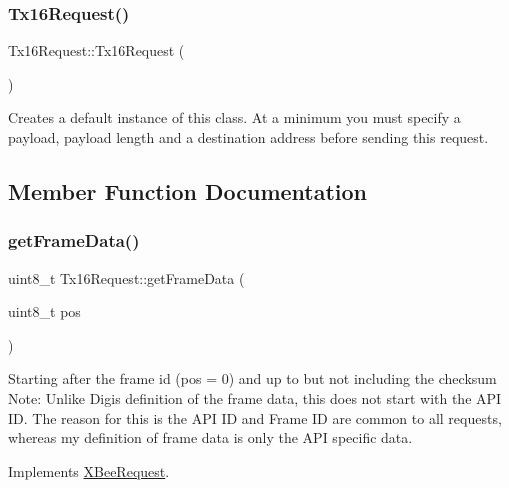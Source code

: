 \subsubsection{\texorpdfstring{Tx16\+Request()}{Tx16Request()}\hspace{0.1cm}{\footnotesize\ttfamily [2/2]}}
{\footnotesize\ttfamily Tx16\+Request\+::\+Tx16\+Request (\begin{DoxyParamCaption}{ }\end{DoxyParamCaption})}

Creates a default instance of this class. At a minimum you must specify a payload, payload length and a destination address before sending this request. 

\subsection{Member Function Documentation}
\hypertarget{class_tx16_request_af5ffbc2164e766d96f54c723996fd389}{}\label{class_tx16_request_af5ffbc2164e766d96f54c723996fd389} 
\subsubsection{\texorpdfstring{get\+Frame\+Data()}{getFrameData()}}
{\footnotesize\ttfamily uint8\+\_\+t Tx16\+Request\+::get\+Frame\+Data (\begin{DoxyParamCaption}\item[{uint8\+\_\+t}]{pos }\end{DoxyParamCaption})\hspace{0.3cm}{\ttfamily [virtual]}}

Starting after the frame id (pos = 0) and up to but not including the checksum Note\+: Unlike Digi\textquotesingle{}s definition of the frame data, this does not start with the A\+PI ID. The reason for this is the A\+PI ID and Frame ID are common to all requests, whereas my definition of frame data is only the A\+PI specific data. 

Implements \hyperlink{class_x_bee_request_ad5b998cd95a570bdaa4d74c6c8790d94}{X\+Bee\+Request}.

\hypertarget{class_tx16_request_a9a1ddfb380e72ecc09a024c6de6cdf8e}{}\label{class_tx16_request_a9a1ddfb380e72ecc09a024c6de6cdf8e} 
